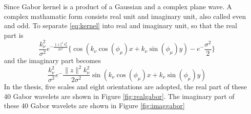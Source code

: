Since Gabor kernel is a product of a Gaussian and a complex plane wave. A complex mathamatic form consists real unit and imaginary unit, also called even and odd. To separate \ref{eq:kernel} into real and imaginary unit, so that the real part is
\begin{equation}\label{eq:real}
\frac{k_{\nu}^2}{\sigma^2}e^{-{\frac{\|z\|^2 k_{\nu}^2}{2\sigma^2}}} \{\cos(k_{\nu}\cos(\phi_{\mu})x+k_{\nu}\sin(\phi_{\mu})y)-e^-{\frac{\sigma^2}{2}}\}
\end{equation}
and the imaginary part becomes
\begin{equation}\label{eq:imag}
\frac{k_{\nu}^2}{\sigma^2} e^-{\frac{\|z\|^2 k_{\nu}^2}{2\sigma^2}} \sin(k_{\nu}\cos(\phi_{\mu})x+k_{\nu}\sin(\phi_{\mu})y)
\end{equation}
In the thesis, five scales and eight orientations are adopted, the real part of these 40 Gabor wavelets are shown in \mbox{Figure} \ref{fig:realgabor}. The imaginary part of these 40 Gabor wavelets are shown in \mbox{Figure} \ref{fig:imaggabor} 
